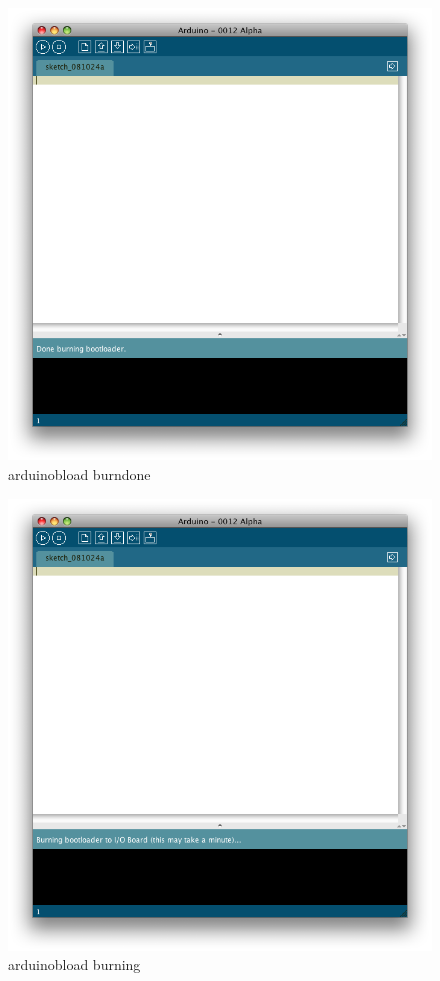 \begin{figure}[!htb]
 \centering
 \includegraphics[scale=0.3]{img/arduino_breadboard/arduinobload_burndone.png}
 \caption{arduinobload burndone}
 \label{arduinobload burndone}
\end{figure}


\begin{figure}[!htb]
 \centering
 \includegraphics[scale=0.3]{img/arduino_breadboard/arduinobload_burning.png}
 \caption{arduinobload burning}
 \label{arduinobload burning}
\end{figure}


